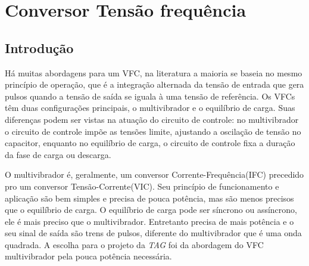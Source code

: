 \chapter[Conversor]{Conversor Tensão frequência}

\section{Introdução}

 \cite{livroprincipal}

Há muitas abordagens para um VFC, na literatura a maioria se baseia no mesmo princípio de operação, que é a integração alternada da tensão de entrada que gera pulsos quando a tensão de saída se iguala à uma tensão de referência.
Os VFCs têm duas configurações principais, o multivibrador e o equilíbrio de carga. Suas diferenças podem ser vistas na atuação do circuito de controle: no multivibrador o circuito de controle impõe as tensões limite, ajustando a oscilação de tensão no capacitor, enquanto no equilíbrio de carga, o circuito de controle fixa a duração da fase de carga ou descarga.

O multivibrador é, geralmente, um conversor Corrente-Frequência(IFC) precedido pro um conversor Tensão-Corrente(VIC). Seu princípio de funcionamento e aplicação são bem simples e precisa de pouca potência, mas são menos precisos que o equilíbrio de carga.
O equilíbrio de carga pode ser síncrono ou assíncrono, ele é mais preciso que o multivibrador. Entretanto precisa de mais potência e o seu sinal de saída são trens de pulsos, diferente do multivibrador que é uma onda quadrada.
A escolha para o projeto da \textit{TAG} foi da abordagem do VFC multivibrador pela pouca potência necessária.

